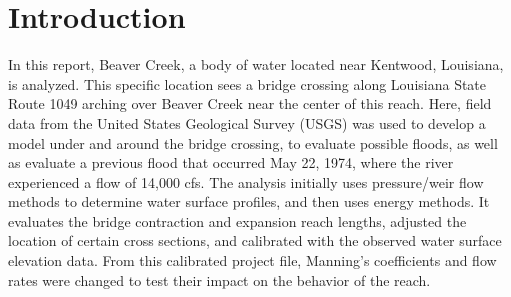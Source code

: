 \documentclass{article}
\begin{document}

\newpage
\tableofcontents
\newpage
{}
\listoftables
{}
\listoffigures
\newpage

\section{Introduction}
\par In this report, Beaver Creek, a body of water located near Kentwood, Louisiana, is analyzed. This specific location sees a bridge crossing along Louisiana State Route 1049 arching over Beaver Creek near the center of this reach. Here, field data from the United States Geological Survey (USGS) was used to develop a model under and around the bridge crossing, to evaluate possible floods, as well as evaluate a previous flood that occurred May 22, 1974, where the river experienced a flow of 14,000 cfs. The analysis initially uses pressure/weir flow methods to determine water surface profiles, and then uses energy methods. It evaluates the bridge contraction and expansion reach lengths, adjusted the location of certain cross sections, and calibrated with the observed water surface elevation data. From this calibrated project file, Manning's coefficients and flow rates were changed to test their impact on the behavior of the reach. 
\newpage
\end{document}
